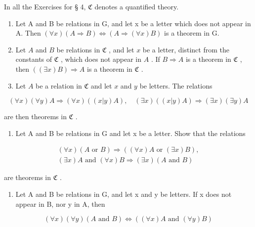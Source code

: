 \exercisegroup

In all the Exercises for § 4, \(\mathfrak{C}\) denotes a quantified theory.

\begin{enumerate}
\def\labelenumi{\arabic{enumi}.}
\item
  Let A and B be relations in G, and let x be a letter which does not appear in A. Then \((\forall x)(A \Longrightarrow B) \Longleftrightarrow (A \Longrightarrow (\forall x)B)\) is a theorem in G.
\item
  Let \(A\) and \(B\) be relations in \(\mathfrak{C}\) , and let \(x\) be a letter, distinct from the constants of \(\mathfrak{C}\) , which does not appear in \(A\) . If \(B \Longrightarrow A\) is a theorem in \(\mathfrak{C}\) , then \(((\exists x)B) \Longrightarrow A\) is a theorem in \(\mathfrak{C}\) .
\item
  Let \(A\) be a relation in \(\mathfrak{C}\) and let \(x\) and \(y\) be letters. The relations
\end{enumerate}

\[
(\forall x) (\forall y) A \Longrightarrow (\forall x) ((x | y) A), \quad (\exists x) ((x | y) A) \Longrightarrow (\exists x) (\exists y) A
\]

are then theorems in \(\mathfrak{C}\) .

\begin{enumerate}
\def\labelenumi{\arabic{enumi}.}
\setcounter{enumi}{3}
\tightlist
\item
  Let A and B be relations in G and let x be a letter. Show that the relations
\end{enumerate}

\[
\begin{array}{l} (\forall x) (A \text { or } B) \Longrightarrow ((\forall x) A \text { or } (\exists x) B), \\ (\exists x) A \text { and } (\forall x) B \Longrightarrow (\exists x) (A \text { and } B) \end{array}
\]

are theorems in \(\mathfrak{C}\) .

\begin{enumerate}
\def\labelenumi{\arabic{enumi}.}
\setcounter{enumi}{4}
\tightlist
\item
  Let A and B be relations in G, and let x and y be letters. If x does not appear in B, nor y in A, then
\end{enumerate}

\[
(\forall x) (\forall y) (A \text {   and   } B) \iff ((\forall x) A \text {   and   } (\forall y) B)
\]

